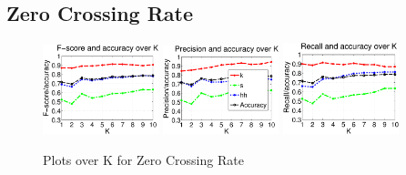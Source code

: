 		
	
	\subsection{Zero Crossing Rate}
		\begin{figure}
			\centering\includegraphics[width=0.3\textwidth]{tex/appendices/test/zcr11FP.png}
			\centering\includegraphics[width=0.3\textwidth]{tex/appendices/test/zcr11_P.png}
			\centering\includegraphics[width=0.3\textwidth]{tex/appendices/test/zcr11_R.png}
			\label{fig:eval:zcr}
			\caption{Plots over K for Zero Crossing Rate}
		\end{figure}
		
